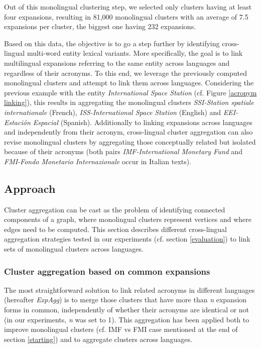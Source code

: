 \documentclass[output=paper]{langsci/langscibook}
\begin{document}
Out of this monolingual clustering step, we selected only clusters
having at least four expansions, resulting in 81,000 monolingual
clusters with an average of 7.5 expansions per cluster, the biggest
one having 232 expansions.

Based on this data, the objective is to go a step further by
identifying cross-lingual multi-word entity lexical variants. More
specifically, the goal is to link multilingual expansions referring to
the same entity across languages and regardless of their acronyms.  To
this end, we leverage the previously computed monolingual clusters and
attempt to link them across languages. Considering the previous
example with the entity \textit{International Space Station}
(cf. Figure \ref{acronym linking}), this results in aggregating the
monolingual clusters \textit{SSI-Station spatiale internationale}
(French), \textit{ISS-International Space Station} (English) and
\textit{EEI-Estaci\'{o}n Espacial} (Spanish).  Additionally to linking
expansions across languages and independently from their acronym,
cross-lingual cluster aggregation can also revise monolingual clusters
by aggregating those conceptually related but isolated because of
their acronyms (both pairs \textit{IMF-International Monetary Fund}
and \textit{FMI-Fondo Monetario Internazionale} occur in Italian
texts).



\subsection{Approach}
\label{approach}

Cluster aggregation can be cast as the problem of identifying
connected components of a graph, where monolingual clusters represent
vertices and where edges need to be computed.  This section describes
different cross-lingual aggregation strategies tested in our
experiments (cf. section \ref{evaluation}) to link sets of monolingual
clusters across languages.

\subsubsection{Cluster aggregation based on common expansions}
\label{aggregation clusters based on common expansions}

The most straightforward solution to link related acronyms in
different langua\-ges (hereafter \textit{ExpAgg}) is to merge those
clusters that have more than \textit{n} expansion forms in common,
independently of whether their acronyms are identical or not (in our
experiments, \textit{n} was set to 1). This aggregation has been
applied both to improve monolingual clusters (cf. IMF vs FMI case
mentioned at the end of section \ref{starting}) and to aggregate
clusters across languages.
\end{document}
